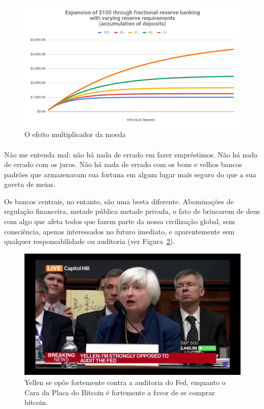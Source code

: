 \begin{figure}
  \centering
  \includegraphics{assets/images/money-multiplier.png}
  \caption{O efeito multiplicador da moeda}
  \label{fig:money-multiplier}
\end{figure}

\paragraph{}
Não me entenda mal: não há nada de errado em fazer empréstimos. Não há nada de errado com os juros. Não há nada de errado com os bons e velhos bancos padrões que armazenavam sua fortuna em algum lugar mais seguro do que a sua gaveta de meias.

Os bancos centrais, no entanto, são uma besta diferente. Abominações de regulação financeira, metade pública metade privada, o fato de brincarem de deus com algo que afeta todos que fazem parte da nossa civilização global, sem consciência, apenas interessados no futuro imediato, e aparentemente sem qualquer responsabilidade ou auditoria (ver Figura~\ref{fig:bsg}).

\begin{figure}
  \centering
  \includegraphics{assets/images/bsg.jpg}
  \caption{Yellen se opõe fortemente contra a auditoria do Fed, enquanto o Cara da Placa do Bitcoin é fortemente a favor de se comprar bitcoin.}
  \label{fig:bsg}
\end{figure}

